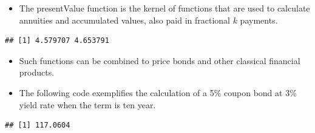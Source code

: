 \begin{frame}[fragile]

\begin{itemize}[<+->]
\itemsep1pt\parskip0pt
\item
  The presentValue function is the kernel of functions that are used to
  calculate annuities and accumulated values, also paid in fractional
  \(k\) payments.
\end{itemize}

\begin{Shaded}
\begin{Highlighting}[]
\StringTok{ }\NormalTok{(}\NormalTok{, }\NormalTok{, }\NormalTok{, }\NormalTok{)}
\StringTok{ }\NormalTok{(}\NormalTok{, }\NormalTok{, }\NormalTok{, }\NormalTok{)}
\end{Highlighting}
\end{Shaded}

\begin{verbatim}
## [1] 4.579707 4.653791
\end{verbatim}

\end{frame}

\begin{frame}[fragile]

\begin{itemize}[<+->]
\item
  Such functions can be combined to price bonds and other classical
  financial products.
\item
  The following code exemplifies the calculation of a 5\% coupon bond at
  3\% yield rate when the term is ten year.
\end{itemize}

\begin{Shaded}
\begin{Highlighting}[]
\NormalTok{*}\NormalTok{(}\NormalTok{,}\NormalTok{)+}\NormalTok{*}\NormalTok{^-}
\end{Highlighting}
\end{Shaded}

\begin{verbatim}
## [1] 117.0604
\end{verbatim}

\end{frame}

